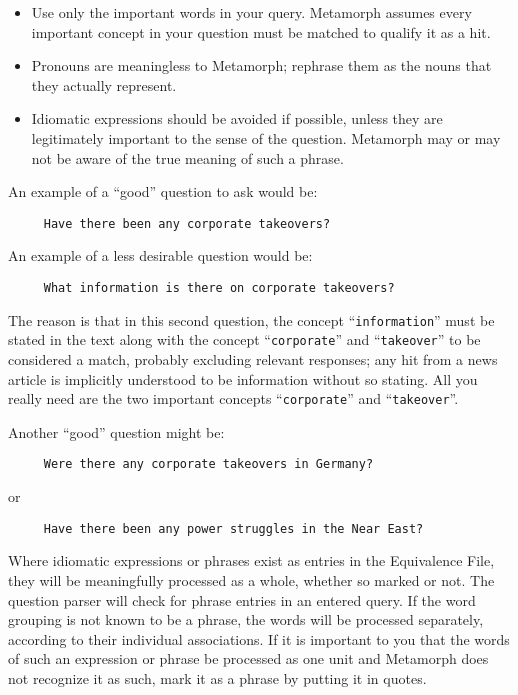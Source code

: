 \begin{itemize}
\item Use only the important words in your query.  Metamorph assumes every
      important concept in your question must be matched to qualify it as a hit.
\item Pronouns are meaningless to Metamorph; rephrase them as the nouns that they
      actually represent.
\item Idiomatic expressions should be avoided if possible, unless they are
      legitimately important to the sense of the question.  Metamorph may or may
      not be aware of the true meaning of such a phrase.
\end{itemize}

     An example of a ``good'' question to ask would be:
\begin{verbatim}
     Have there been any corporate takeovers?
\end{verbatim}
     An example of a less desirable question would be:
\begin{verbatim}
     What information is there on corporate takeovers?
\end{verbatim}
     The reason is that in this second question, the concept ``\verb`information`''
must be stated in the text along with the concept ``\verb`corporate`'' and
``\verb`takeover`'' to be considered a match, probably excluding relevant responses;
any hit from a news article is implicitly understood to be information without
so stating.  All you really need are the two important concepts ``\verb`corporate`''
and ``\verb`takeover`''.

     Another ``good'' question might be:
\begin{verbatim}
     Were there any corporate takeovers in Germany?
\end{verbatim}
     or
\begin{verbatim}
     Have there been any power struggles in the Near East?
\end{verbatim}

Where idiomatic expressions or phrases exist as entries in the
Equivalence File, they will be meaningfully processed as a whole,
whether so marked or not.  The question parser will check for phrase
entries in an entered query.  If the word grouping is not known to be
a phrase, the words will be processed separately, according to their
individual associations.  If it is important to you that the words of
such an expression or phrase be processed as one unit and Metamorph
does not recognize it as such, mark it as a phrase by putting it in
quotes.

